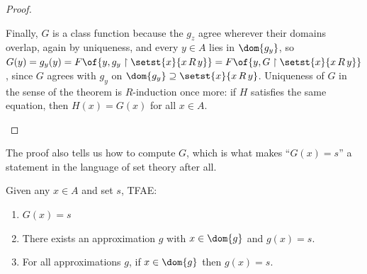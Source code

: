 \begin{proof}
\begin{description}
            Finally, $G$ is a class function because the $g_z$ agree wherever their domains overlap, again by uniqueness, and every $y \in A$ lies in $\dom{g_y}$, so $G(y) = g_y(y) = F\of{y, g_y \restriction \setst{x}{x \, R \, y}} = F\of{y, G \restriction \setst{x}{x \, R \, y}}$, since $G$ agrees with $g_y$ on $\dom{g_y} \supseteq \setst{x}{x \, R \, y}$. Uniqueness of $G$ in the sense of the theorem is $R$-induction once more: if $H$ satisfies the same equation, then $H(x) = G(x)$ for all $x \in A$.
    \end{description}
\end{proof}

The proof also tells us how to compute $G$, which is what makes ``$G(x) = s$'' a statement in the language of set theory after all.

\begin{boxlemma}
    Given any $x \in A$ and set $s$, TFAE:
    \begin{enumerate}
        \item $G(x) = s$
        \item There exists an approximation $g$ with $x \in \dom{g}$ and $g(x) = s$.
        \item For all approximations $g$, if $x \in \dom{g}$ then $g(x) = s$.
    \end{enumerate}
\end{boxlemma}
